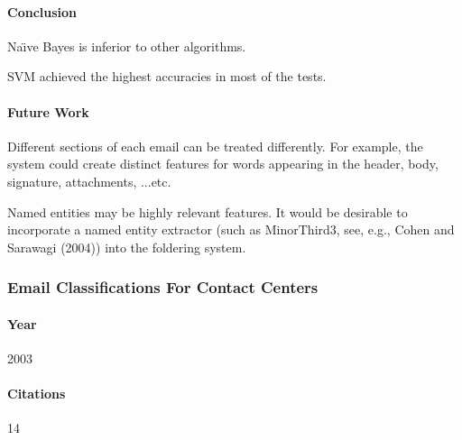 \documentclass[12pt]{article}
\newenvironment{my_itemize}
{\begin{itemize}
  \setlength{\itemsep}{0cm}
  \setlength{\parskip}{0cm}}
{\end{itemize}}
\begin{document}
\paragraph{Conclusion}
\begin{my_itemize}
    \item Na\"{\i}ve Bayes is inferior to other algorithms.
    \item SVM achieved the highest accuracies in most of the tests.
\end{my_itemize}

\paragraph{Future Work}
\begin{my_itemize}
    \item Different sections of each email can be treated differently. 
	  For example, the system could create distinct features for words appearing 
	  in the header, body, signature, attachments, ...etc.
    \item Named entities may be highly relevant features. It would be desirable to 
	  incorporate a named entity extractor (such as MinorThird3, see, e.g., 
	  Cohen and Sarawagi (2004)) into the foldering system.
\end{my_itemize}


\subsubsection{Email Classifications For Contact Centers \cite{ANI03}}
\paragraph{Year} 2003
\paragraph{Citations} 14
\end{document}
